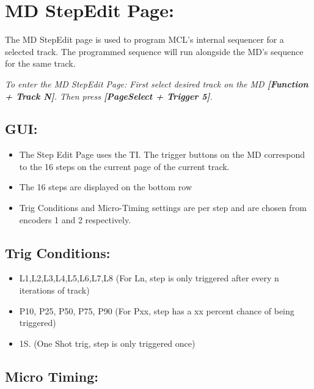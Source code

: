 \chapter{MD StepEdit Page:}

The MD StepEdit page is used to program MCL's internal sequencer for a selected track. The programmed sequence will run alongside the MD's sequence for the same track.


\textit{To enter the MD StepEdit Page: First select desired track on the MD \textbf{[Function + Track N]}. Then press \textbf{[PageSelect + Trigger 5]}.}



\section{GUI:}
\begin{itemize}
\item The Step Edit Page uses the TI. The trigger buttons on the MD correspond to the 16 steps on the current page of the current track.
\item The 16 steps are displayed on the bottom row
\item Trig Conditions and Micro-Timing settings are per step and are chosen from encoders 1 and 2 respectively.
\end{itemize}

\section{Trig Conditions:}
\begin{itemize}
\item L1,L2,L3,L4,L5,L6,L7,L8 (For Ln, step is only triggered after every n iterations of track)
\item P10, P25, P50, P75, P90 (For Pxx, step has a xx percent chance of being triggered)
\item 1S. (One Shot trig, step is only triggered once)
\end{itemize}
\section{Micro Timing:}

